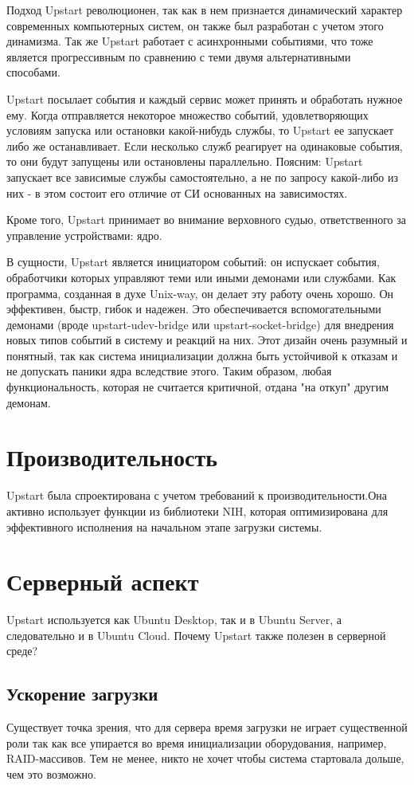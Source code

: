 Подход Upstart революционен, так как в нем признается динамический характер современных компьютерных систем, он также был разработан с учетом этого динамизма. Так же Upstart работает с асинхронными событиями, что тоже является прогрессивным по сравнению с теми двумя альтернативными способами.

Upstart посылает события и каждый сервис может принять и обработать нужное ему. Когда отправляется некоторое множество событий, удовлетворяющих условиям запуска или остановки какой-нибудь службы, то Upstart ее запускает либо же останавливает. Если несколько служб реагирует на одинаковые события, то они будут запущены или остановлены параллельно. Поясним: Upstart запускает все зависимые службы самостоятельно, а не по запросу какой-либо из них - в этом состоит его отличие от СИ основанных на зависимостях.

Кроме того, Upstart принимает во внимание верховного судью, ответственного за управление устройствами: ядро.

В сущности, Upstart является инициатором событий: он испускает события, обработчики которых управляют теми или иными демонами или службами. Как программа, созданная в духе Unix-way, он делает эту работу очень хорошо. Он эффективен, быстр, гибок и надежен. Это обеспечивается вспомогательными демонами (вроде upstart-udev-bridge или upstart-socket-bridge) для внедрения новых типов событий в систему и реакций на них. Этот дизайн очень разумный и понятный, так как система инициализации должна быть устойчивой к отказам и не допускать паники ядра вследствие этого. Таким образом, любая функциональность, которая не считается критичной, отдана "на откуп" другим демонам.
\section{Производительность}
Upstart была спроектирована с учетом требований к производительности.Она активно использует функции из библиотеки NIH, которая оптимизирована для эффективного исполнения на начальном этапе загрузки системы. 
\section{Серверный аспект} 
Upstart используется как Ubuntu Desktop, так и в Ubuntu Server, а следовательно и в Ubuntu Cloud. Почему Upstart также полезен в серверной среде?
\subsection{Ускорение загрузки}
Существует точка зрения, что для сервера время загрузки не играет существенной роли так как все упирается во время инициализации оборудования, например, RAID-массивов. Тем не менее, никто не хочет чтобы система стартовала дольше, чем это возможно.

